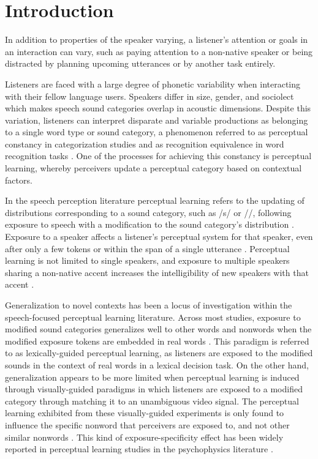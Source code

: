 
\chapter{Introduction}
In addition to properties of the speaker varying, a listener's attention or goals in an interaction can vary, such as paying attention to a non-native speaker or being distracted by planning upcoming utterances or by another task entirely.  

Listeners are faced with a large degree of phonetic variability when interacting with their fellow language users.  
Speakers differ in size, gender, and sociolect which makes speech sound categories overlap in acoustic dimensions.
Despite this variation, listeners can interpret disparate and variable productions as belonging to a single word type or sound category, a phenomenon referred to as perceptual constancy in categorization studies \citep{Shankweiler1977, Kuhl1979} and as recognition equivalence in word recognition tasks \citep{Sumner2013}.
One of the processes for achieving this constancy is perceptual learning, whereby perceivers update a perceptual category based on contextual factors.

In the speech perception literature perceptual learning refers to the updating of distributions corresponding to a sound category, such as /s/ or /\textesh/, following exposure to speech with a modification to the sound category's distribution \citep{Norris2003}.
Exposure to a speaker affects a listener's perceptual system for that speaker,  even after only a few tokens \citep{Vroomen2007, Kraljic2008} or within the span of a single utterance \citep{Ladefoged1957}.
Perceptual learning is not limited to single speakers, and exposure to multiple speakers sharing a non-native accent increases the intelligibility of new speakers with that accent \citep{Bradlow2008}.

Generalization to novel contexts has been a locus of investigation within the speech-focused perceptual learning literature. Across most studies, exposure to modified sound categories generalizes well to other words and nonwords when the modified exposure tokens are embedded in real words \citep{Norris2003, Reinisch2013}.  
This paradigm is referred to as lexically-guided perceptual learning, as listeners are exposed to the modified sounds in the context of real words in a lexical decision task.
On the other hand, generalization appears to be more limited when perceptual learning is induced through visually-guided paradigms in which listeners are exposed to a modified category through matching it to an unambiguous video signal.  
The perceptual learning exhibited from these visually-guided experiments is only found to influence the specific nonword that perceivers are exposed to, and not other similar nonwords \citep{Reinisch2014}.  
This kind of exposure-specificity effect has been widely reported in perceptual learning studies in the psychophysics literature \citep{Gibson1953}.

